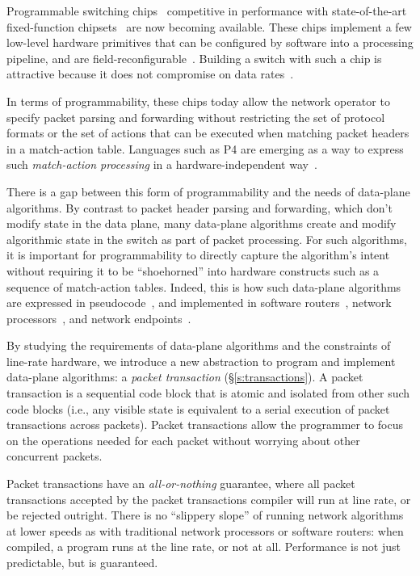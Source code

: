 Programmable switching chips~\cite{flexpipe, xpliant, rmt, corsa,
  uadp, algo_logic} competitive in performance with state-of-the-art
fixed-function chipsets~\cite{trident, tomahawk, mellanox} are now
becoming available. These chips implement a few low-level hardware
primitives that can be configured by software into a processing
pipeline, and are
field-reconfigurable~\cite{xpliant_sdk,xpliant_sdk2,intel_sdk}. Building
a switch with such a chip is attractive because it does not compromise
on data rates~\cite{rmt}.

In terms of programmability, these chips today allow the network
operator to specify packet parsing and forwarding without restricting
the set of protocol formats or the set of actions that can be executed
when matching packet headers in a match-action table. Languages such
as P4 are emerging as a way to express such {\em match-action
  processing} in a hardware-independent way~\cite{p4,p4spec,dc_p4}.

There is a gap between this form of programmability and the needs of data-plane
algorithms. By contrast to packet header parsing and forwarding, which don't
modify state in the data plane, many data-plane algorithms create and modify
algorithmic state in the switch as part of packet processing. For such
algorithms, it is important for programmability to directly capture the
algorithm's intent without requiring it to be ``shoehorned'' into hardware
constructs such as a sequence of match-action tables. Indeed, this is how such
data-plane algorithms are expressed in pseudocode~\cite{red, csfq, codel_code,
avq, blue}, and implemented in software routers~\cite{click, dpdk,
routebricks}, network processors~\cite{packetc, nova}, and network
endpoints~\cite{qdisc}.

By studying the requirements of data-plane algorithms and the constraints of
line-rate hardware, we introduce a new abstraction to program and implement
data-plane algorithms: a {\em packet transaction} (\S\ref{s:transactions}). A
packet transaction is a sequential code block that is atomic and isolated from
other such code blocks (i.e., any visible state is equivalent to a serial
execution of packet transactions across packets). Packet transactions allow the
programmer to focus on the operations needed for each packet without worrying
about other concurrent packets.

Packet transactions have an \textit{all-or-nothing} guarantee, where all packet
transactions accepted by the packet transactions compiler will run at line
rate, or be rejected outright. There is no ``slippery slope'' of running
network algorithms at lower speeds as with traditional network processors or
software routers: when compiled, a \pktlanguage program runs at the line rate,
or not at all.  Performance is not just predictable, but is guaranteed.

